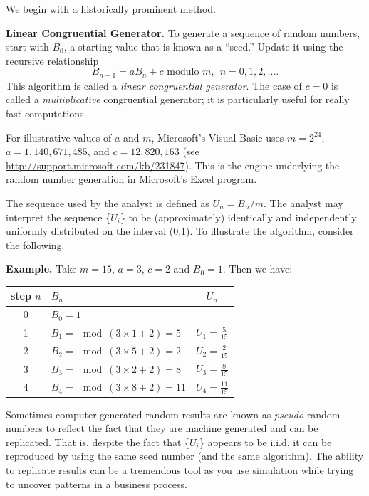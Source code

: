\documentclass[]{book}
\theoremstyle{definition}
\theoremstyle{definition}
\theoremstyle{definition}
\theoremstyle{remark}
\begin{document}
We begin with a historically prominent method.

\textbf{Linear Congruential Generator.} To generate a sequence of random
numbers, start with \(B_0\), a starting value that is known as a
``seed.'' Update it using the recursive relationship
\[B_{n+1} = a B_n + c  \text{ modulo }m, ~~ n=0, 1, 2, \ldots .\] This
algorithm is called a \emph{linear congruential generator}. The case of
\(c=0\) is called a \emph{multiplicative} congruential generator; it is
particularly useful for really fast computations.

For illustrative values of \(a\) and \(m\), Microsoft's Visual Basic
uses \(m=2^{24}\), \(a=1,140,671,485\), and \(c = 12,820,163\) (see
\url{http://support.microsoft.com/kb/231847}). This is the engine
underlying the random number generation in Microsoft's Excel program.

The sequence used by the analyst is defined as \(U_n=B_n/m.\) The
analyst may interpret the sequence \{\(U_{i}\)\} to be (approximately)
identically and independently uniformly distributed on the interval
(0,1). To illustrate the algorithm, consider the following.

\textbf{Example.} Take \(m=15\), \(a=3\), \(c=2\) and \(B_0=1\). Then we
have:

\begin{longtable}[]{@{}clc@{}}
\toprule
step \(n\) & \(B_n\) & \(U_n\)\tabularnewline
\midrule
\endhead
\begin{minipage}[t]{0.32\columnwidth}\centering\strut
0\strut
\end{minipage} & \begin{minipage}[t]{0.32\columnwidth}\raggedright\strut
\(B_0=1\)\strut
\end{minipage} & \begin{minipage}[t]{0.32\columnwidth}\centering\strut
\strut
\end{minipage}\tabularnewline
1 & \(B_1 =\mod(3 \times 1 +2) = 5\) &
\(U_1 = \frac{5}{15}\)\tabularnewline
2 & \(B_2 =\mod(3 \times 5 +2) = 2\) &
\(U_2 = \frac{2}{15}\)\tabularnewline
3 & \(B_3 =\mod(3 \times 2 +2) = 8\) &
\(U_3 = \frac{8}{15}\)\tabularnewline
4 & \(B_4 =\mod(3 \times 8 +2) = 11\) &
\(U_4 = \frac{11}{15}\)\tabularnewline
\bottomrule
\end{longtable}

Sometimes computer generated random results are known as
\emph{pseudo}-random numbers to reflect the fact that they are machine
generated and can be replicated. That is, despite the fact that
\{\(U_{i}\)\} appears to be i.i.d, it can be reproduced by using the
same seed number (and the same algorithm). The ability to replicate
results can be a tremendous tool as you use simulation while trying to
uncover patterns in a business process.
\end{document}
